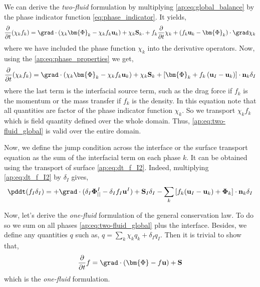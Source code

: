 We can derive the \textit{two-fluid} formulation by multiplying \ref{ap:eq:global_balance} by the phase indicator function \ref{eq:phase_indicator}. 
It yields, 
\begin{equation*}
    \frac{\partial}{\partial t} (\chi_k f_k)
    = \grad \cdot (\chi_k \bm{\Phi}_k - \chi_k f_k \textbf{u}_k)
    + \chi_k \textbf{S}_k.
    + f_k \frac{\partial}{\partial t} \chi_k
    + \left(
        f_k \textbf{u}_k 
        - \bm{\Phi}_k
    \right) \cdot \grad \chi_k
\end{equation*}
where we have included the phase function $\chi_k$ into the derivative operators. 
Now, using the \ref{ap:eq:phase_properties} we get, 
\begin{equation}
    \frac{\partial}{\partial t} (\chi_k f_k)
    = \grad \cdot (\chi_k \bm{\Phi}_k - \chi_k f_k \textbf{u}_k)
    + \chi_k \textbf{S}_k
    + \left[
        \bm{\Phi}_k 
        + f_k 
        \left(
            \textbf{u}_I
            - \textbf{u}_k
        \right) 
    \right]
    \cdot \textbf{n}_k \delta_I 
    \label{ap:eq:two-fluid_global}
\end{equation}
where the last term is the interfacial source term, such as the drag force if $f_k$ is the momentum or the mass transfer if $f_k$ is the density. 
In this equation note that all quantities are factor of the phase indicator function $\chi_k$. 
So we transport $\chi_k f_k$ which is field quantity defined over the whole domain. 
Thus, \ref{ap:eq:two-fluid_global} is valid over the entire domain.   

Now, we define the jump condition across the interface or the surface transport equation as the sum of the interfacial term on each phase $k$. 
It can be obtained using  the transport of surface \ref{ap:eq:dt_f_I2}.
Indeed, multiplying \ref{ap:eq:dt_f_I2} by $\delta_I$ gives, 
\begin{equation}
    \pddt (f_I\delta_I)  
    = 
    + \grad \cdot (\delta_I \mathbf{\Phi}^I_{||} - \delta_I f_I \textbf{u}^I)
    +\textbf{S}_I \delta_I
    - \sum_k \left[
    f_k (\textbf{u}_I - \textbf{u}_k)
    + \mathbf{\Phi}_k
    \right] \cdot \textbf{n}_k \delta_I
    \label{ap:eq:general_jump}
\end{equation}

Now, let's derive the \textit{one-fluid} formulation of the general conservation law.
To do so we sum on all phases \ref{ap:eq:two-fluid_global} plus the interface. 
Besides, we define any quantities $q$ such as, $q = \sum_k \chi_k q_k + \delta_I q_I$.
Then it is trivial to show that, 
\begin{equation}
    \frac{\partial}{\partial t} f
    = \grad \cdot (\bm{\Phi} - f \textbf{u})
    + \textbf{S}
    \label{ap:eq:one-fluid_global}
\end{equation}
which is the \textit{one-fluid} formulation. 

